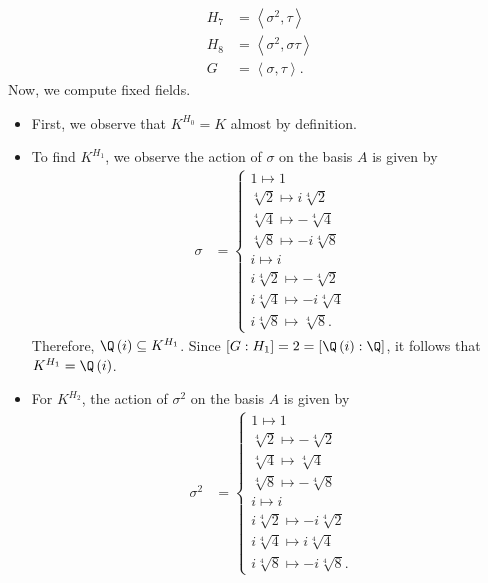\documentclass[10pt]{mypackage}
\begin{document}
\begin{solution}
\begin{enumerate}[(a)]
\begin{align*}
        H_7 &= \left\langle \sigma^2,\tau \right\rangle\\
        H_8 &= \left\langle \sigma^2,\sigma\tau \right\rangle\\
        G &= \left\langle \sigma,\tau \right\rangle.
      \end{align*}
      Now, we compute fixed fields.
      \begin{itemize}
        \item First, we observe that $K^{H_0} = K$ almost by definition.
        \item To find $K^{H_1}$, we observe the action of $\sigma$ on the basis $A$ is given by
          \begin{align*}
            \sigma &= \begin{cases}
              1\mapsto 1\\
              \sqrt[4]{2} \mapsto i\sqrt[4]{2}\\
              \sqrt[4]{4} \mapsto -\sqrt[4]{4}\\
              \sqrt[4]{8} \mapsto -i\sqrt[4]{8}\\
              i \mapsto i\\
              i\sqrt[4]{2} \mapsto -\sqrt[4]{2}\\
              i\sqrt[4]{4} \mapsto -i\sqrt[4]{4}\\
              i\sqrt[4]{8} \mapsto \sqrt[4]{8}.
            \end{cases}
          \end{align*}
          Therefore, $\Q\left( i \right)\subseteq K^{H_1}$. Since $\left[ G:H_1 \right] = 2 = \left[ \Q\left( i \right):\Q \right]$, it follows that $K^{H_1} = \Q\left( i \right)$.
        \item For $K^{H_2}$, the action of $\sigma^2$ on the basis $A$ is given by
          \begin{align*}
            \sigma^2 &= \begin{cases}
              1\mapsto 1\\
              \sqrt[4]{2} \mapsto -\sqrt[4]{2}\\
              \sqrt[4]{4} \mapsto \sqrt[4]{4}\\
              \sqrt[4]{8} \mapsto -\sqrt[4]{8}\\
              i\mapsto i\\
              i\sqrt[4]{2}\mapsto -i\sqrt[4]{2}\\
              i\sqrt[4]{4} \mapsto i\sqrt[4]{4}\\
              i\sqrt[4]{8} \mapsto -i\sqrt[4]{8}.

\end{cases}
\end{align*}
\end{itemize}
\end{enumerate}
\end{solution}
\end{document}
